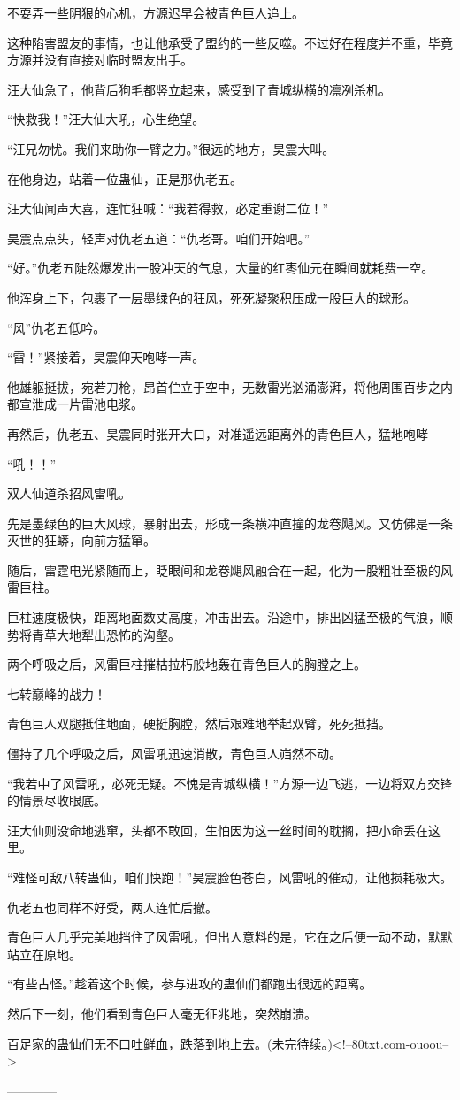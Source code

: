 \begin{this_body}
不耍弄一些阴狠的心机，方源迟早会被青色巨人追上。

这种陷害盟友的事情，也让他承受了盟约的一些反噬。不过好在程度并不重，毕竟方源并没有直接对临时盟友出手。

汪大仙急了，他背后狗毛都竖立起来，感受到了青城纵横的凛冽杀机。

“快救我！”汪大仙大吼，心生绝望。

“汪兄勿忧。我们来助你一臂之力。”很远的地方，昊震大叫。

在他身边，站着一位蛊仙，正是那仇老五。

汪大仙闻声大喜，连忙狂喊：“我若得救，必定重谢二位！”

昊震点点头，轻声对仇老五道：“仇老哥。咱们开始吧。”

“好。”仇老五陡然爆发出一股冲天的气息，大量的红枣仙元在瞬间就耗费一空。

他浑身上下，包裹了一层墨绿色的狂风，死死凝聚积压成一股巨大的球形。

“风”仇老五低吟。

“雷！”紧接着，昊震仰天咆哮一声。

他雄躯挺拔，宛若刀枪，昂首伫立于空中，无数雷光汹涌澎湃，将他周围百步之内都宣泄成一片雷池电浆。

再然后，仇老五、昊震同时张开大口，对准遥远距离外的青色巨人，猛地咆哮

“吼！！”

双人仙道杀招风雷吼。

先是墨绿色的巨大风球，暴射出去，形成一条横冲直撞的龙卷飓风。又仿佛是一条灭世的狂蟒，向前方猛窜。

随后，雷霆电光紧随而上，眨眼间和龙卷飓风融合在一起，化为一股粗壮至极的风雷巨柱。

巨柱速度极快，距离地面数丈高度，冲击出去。沿途中，排出凶猛至极的气浪，顺势将青草大地犁出恐怖的沟壑。

两个呼吸之后，风雷巨柱摧枯拉朽般地轰在青色巨人的胸膛之上。

七转巅峰的战力！

青色巨人双腿抵住地面，硬挺胸膛，然后艰难地举起双臂，死死抵挡。

僵持了几个呼吸之后，风雷吼迅速消散，青色巨人岿然不动。

“我若中了风雷吼，必死无疑。不愧是青城纵横！”方源一边飞逃，一边将双方交锋的情景尽收眼底。

汪大仙则没命地逃窜，头都不敢回，生怕因为这一丝时间的耽搁，把小命丢在这里。

“难怪可敌八转蛊仙，咱们快跑！”昊震脸色苍白，风雷吼的催动，让他损耗极大。

仇老五也同样不好受，两人连忙后撤。

青色巨人几乎完美地挡住了风雷吼，但出人意料的是，它在之后便一动不动，默默站立在原地。

“有些古怪。”趁着这个时候，参与进攻的蛊仙们都跑出很远的距离。

然后下一刻，他们看到青色巨人毫无征兆地，突然崩溃。

百足家的蛊仙们无不口吐鲜血，跌落到地上去。(未完待续。)<!--80txt.com-ouoou-->

------------

\end{this_body}

